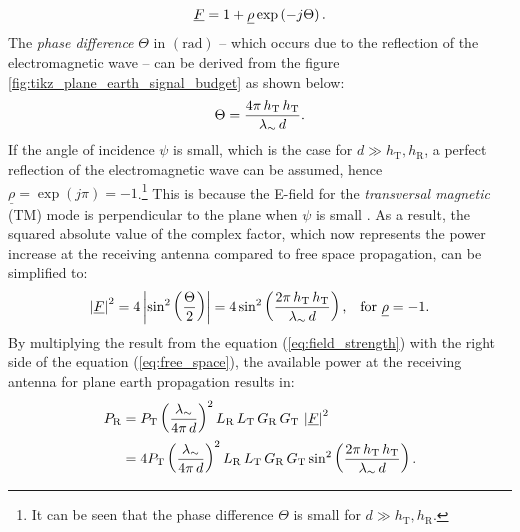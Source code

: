 \begin{equation} \label{eq:field_strength}
	\centering
	\underline{F} = 1 + \underline{\rho} \exp \left( - j \Theta \right)\text{.}
\end{equation}
The \emph{phase difference} $\Theta$ in $\left(\mathrm{rad}\right)$ -- which occurs due to the reflection of the electromagnetic wave -- can be derived from the figure \ref{fig:tikz_plane_earth_signal_budget} as shown below:
\begin{equation} \label{eq:phase_difference}
	\centering
	\Theta = \dfrac{4\pi \, h_\mathrm{T} \, h_\mathrm{T}}{\lambda_\sim \, d}\text{.}
\end{equation}
If the angle of incidence $\psi$ is small, which is the case for $d \gg h_\mathrm{T}, h_\mathrm{R}$, a perfect reflection of the electromagnetic wave can be assumed, hence $\underline{\rho} = \exp(j\pi) = -1$.\footnote{It can be seen that the phase difference $\Theta$ is small for $d \gg h_\mathrm{T}, h_\mathrm{R}$.} This is because the E-field for the \emph{transversal magnetic} (TM) mode is perpendicular to the plane when $\psi$ is small \cite{Mecklenbrauker:2017}. As a result, the squared absolute value of the complex factor, which now represents the power increase at the receiving antenna compared to free space propagation, can be simplified to:
\begin{equation} \label{eq:field_strength}
	\centering
	\left|\underline{F}\right|^2 = 4 \left| \sin^2 \left(\dfrac{\Theta}{2}\right) \right| = 4 \sin^2 \left(\dfrac{2\pi \, h_\mathrm{T} \, h_\mathrm{T}}{\lambda_\sim \, d}\right) \text{,} \quad \text{for } \underline{\rho} = -1\text{.}
\end{equation}
By multiplying the result from the equation (\ref{eq:field_strength}) with the right side of the equation (\ref{eq:free_space}), the available power at the receiving antenna for plane earth propagation results in: 
\begin{equation} \label{eq:plane_earth}
	\centering
	\begin{aligned}
	P_\mathrm{R} & = P_\mathrm{T} \left(\dfrac{\lambda_\sim}{4 \pi \, d}\right)^2 L_\mathrm{R} \, L_\mathrm{T} \, G_\mathrm{R} \, G_\mathrm{T} \, \left|\underline{F}\right|^2 \\
				 & = 4P_\mathrm{T} \left(\dfrac{\lambda_\sim}{4 \pi \, d}\right)^2 L_\mathrm{R} \, L_\mathrm{T} \, G_\mathrm{R} \, G_\mathrm{T} \sin^2 \left(\dfrac{2\pi \, h_\mathrm{T} \, h_\mathrm{T}}{\lambda_\sim \, d}\right)\text{.}
	\end{aligned}
\end{equation}
